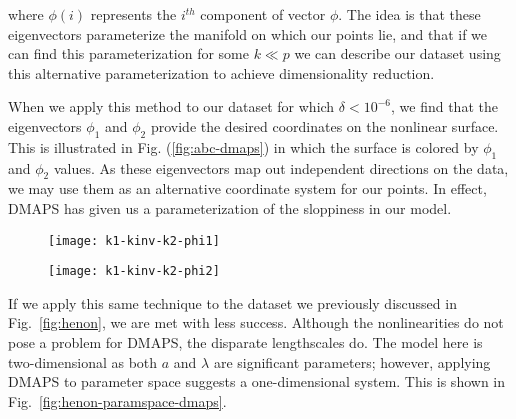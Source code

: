 where $\phi(i)$ represents the $i^{th}$ component of vector
$\phi$. The idea is that these eigenvectors parameterize the manifold
on which our points lie, and that if we can find this parameterization
for some $k \ll p$ we can describe our dataset using this alternative
parameterization to achieve dimensionality reduction.

When we apply this method to our dataset for which $\delta < 10^{-6}$,
we find that the eigenvectors $\phi_1$ and $\phi_2$ provide the
desired coordinates on the nonlinear surface. This is illustrated in
Fig. (\ref{fig:abc-dmaps}) in which the surface is colored by $\phi_1$
and $\phi_2$ values. As these eigenvectors map out independent
directions on the data, we may use them as an alternative coordinate
system for our points. In effect, DMAPS has given us a
parameterization of the sloppiness in our model.

\begin{figure*}
  \centering
  \begin{subfigure}[t]{0.45\linewidth}
    \centering
    \texttt{[image: k1-kinv-k2-phi1]}
  \end{subfigure}
  \hspace{0.5cm}
  \begin{subfigure}[t]{0.45\linewidth}
    \centering
    \texttt{[image: k1-kinv-k2-phi2]}
  \end{subfigure}
  \caption[Parameter space of kinetics model colored by DMAPS
  output]{Parameter space colored by $\phi_1$ (left) and $\phi_2$
    (right), which uncovers one of the directions along this nonlinear
    sloppy manifold. \label{fig:abc-dmaps} }
\end{figure*}

If we apply this same technique to the dataset we previously discussed
in Fig.~\ref{fig:henon}, we are met with less success. Although the
nonlinearities do not pose a problem for DMAPS, the disparate
lengthscales do. The model here is two-dimensional as both $a$ and
$\lambda$ are significant parameters; however, applying DMAPS to
parameter space suggests a one-dimensional system. This is shown in
Fig.~\ref{fig:henon-paramspace-dmaps}.

